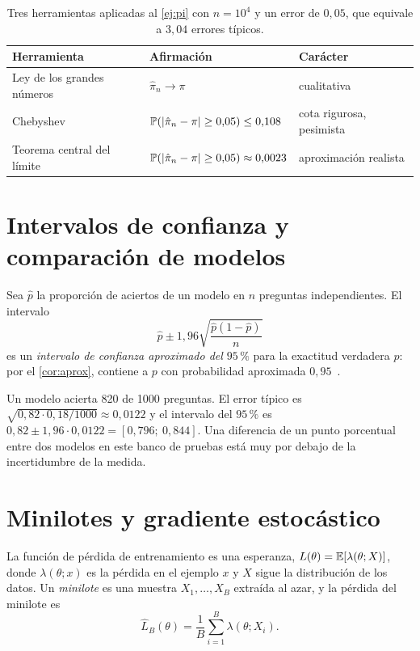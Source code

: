 \begin{table}[h]
\centering\small
\caption{Tres herramientas aplicadas al \cref{ej:pi} con $n=10^{4}$ y un error de $0{,}05$, que equivale a $3{,}04$ errores típicos.}\label{tab:herramientas}
\begin{tabular}{@{}lll@{}}
\toprule
Herramienta & Afirmación & Carácter \\
\midrule
Ley de los grandes números & $\hat\pi_n\to\pi$ & cualitativa \\
Chebyshev & $\mathbb{P}(\lvert\hat\pi_n-\pi\rvert\ge 0{,}05)\le 0{,}108$ & cota rigurosa, pesimista \\
Teorema central del límite & $\mathbb{P}(\lvert\hat\pi_n-\pi\rvert\ge 0{,}05)\approx 0{,}0023$ & aproximación realista \\
\bottomrule
\end{tabular}
\end{table}

\section{Intervalos de confianza y comparación de modelos}

\begin{definicion}
Sea $\hat p$ la proporción de aciertos de un modelo en $n$ preguntas independientes. El intervalo
\[
\hat p\pm 1{,}96\sqrt{\frac{\hat p(1-\hat p)}{n}}
\]
es un \emph{intervalo de confianza aproximado del $95\,\%$} para la exactitud verdadera $p$: por el \cref{cor:aprox}, contiene a $p$ con probabilidad aproximada $0{,}95$~\cite[clase~22]{mit1805}.
\end{definicion}

\begin{ejemplo}\label{ej:benchmark}
Un modelo acierta 820 de 1000 preguntas. El error típico es $\sqrt{0{,}82\cdot 0{,}18/1000}\approx 0{,}0122$ y el intervalo del $95\,\%$ es $0{,}82\pm 1{,}96\cdot 0{,}0122=[0{,}796;\ 0{,}844]$. Una diferencia de un punto porcentual entre dos modelos en este banco de pruebas está muy por debajo de la incertidumbre de la medida.
\end{ejemplo}

\section{Minilotes y gradiente estocástico}

La función de pérdida de entrenamiento es una esperanza, $L(\theta)=\mathbb{E}[\lambda(\theta;X)]$, donde $\lambda(\theta;x)$ es la pérdida en el ejemplo $x$ y $X$ sigue la distribución de los datos. Un \emph{minilote} es una muestra $X_1,\dots,X_B$ extraída al azar, y la pérdida del minilote es
\[
\hat L_B(\theta)=\frac1B\sum_{i=1}^{B}\lambda(\theta;X_i).
\]

